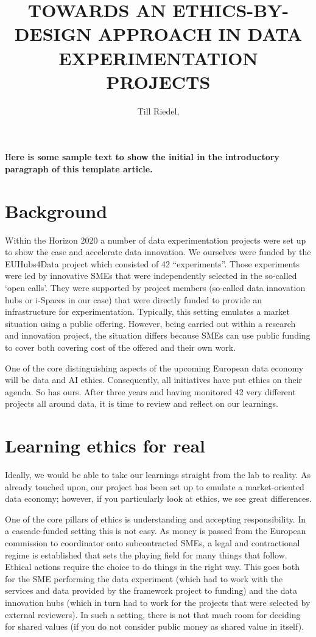 \documentclass[	DIV=calc,%
							paper=a4,%
							fontsize=11pt,%
							twocolumn, draft]{scrartcl}	 					%
\title{TOWARDS AN ETHICS-BY-DESIGN APPROACH IN DATA EXPERIMENTATION PROJECTS}					%
\author{Till Riedel, }											%
\date{}																				%
\newcommand{\initial}[1]{%
     \lettrine[lines=3,lhang=0.3,nindent=0em]{
     				\color{DarkGoldenrod}
     				{\textsf{#1}}}{}}
\begin{document}
\maketitle
\thispagestyle{fancy} 			%
\initial{H}\textbf{ere is some sample text to show the initial in the introductory paragraph of this template article.}
\section{Background}\label{background}

Within the Horizon 2020 a number of data experimentation projects were
set up to show the case and accelerate data innovation. We ourselves
were funded by the EUHubs4Data project which consisted of 42
``experiments''. Those experiments were led by innovative SMEs that were
independently selected in the so-called `open calls'. They were
supported by project members (so-called data innovation hubs or i-Spaces
in our case) that were directly funded to provide an infrastructure for
experimentation. Typically, this setting emulates a market situation
using a public offering. However, being carried out within a research
and innovation project, the situation differs because SMEs can use
public funding to cover both covering cost of the offered and their own
work.

One of the core distinguishing aspects of the upcoming European data
economy will be data and AI ethics. Consequently, all initiatives have
put ethics on their agenda. So has ours. After three years and having
monitored 42 very different projects all around data, it is time to
review and reflect on our learnings.

\section{Learning ethics for real}\label{learning-ethics-for-real}

Ideally, we would be able to take our learnings straight from the lab to
reality. As already touched upon, our project has been set up to emulate
a market-oriented data economy; however, if you particularly look at
ethics, we see great differences.

One of the core pillars of ethics is understanding and accepting
responsibility. In a cascade-funded setting this is not easy. As money
is passed from the European commission to coordinator onto subcontracted
SMEs, a legal and contractional regime is established that sets the
playing field for many things that follow. Ethical actions require the
choice to do things in the right way. This goes both for the SME
performing the data experiment (which had to work with the services and
data provided by the framework project to funding) and the data
innovation hubs (which in turn had to work for the projects that were
selected by external reviewers). In such a setting, there is not that
much room for deciding for shared values (if you do not consider public
money as shared value in itself).
\end{document}
